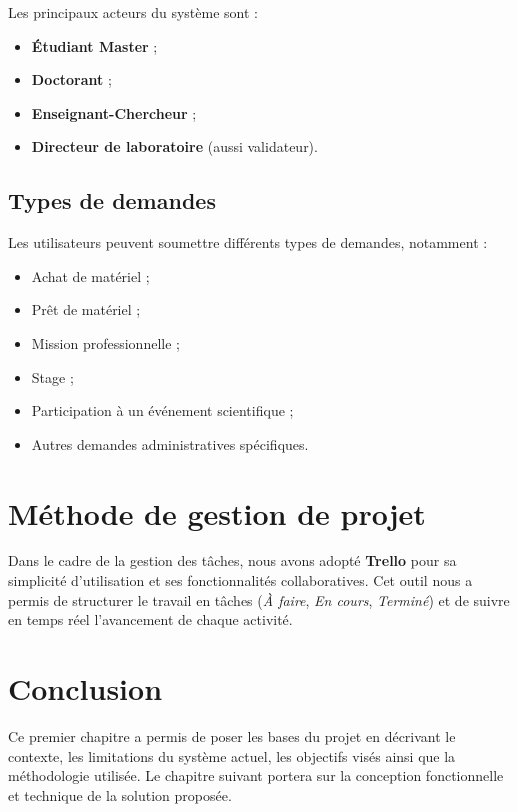 Les principaux acteurs du système sont :
\begin{itemize}
  \item \textbf{Étudiant Master} ;
  \item \textbf{Doctorant} ;
  \item \textbf{Enseignant-Chercheur} ;
  \item \textbf{Directeur de laboratoire} (aussi validateur).
\end{itemize}

\subsection{Types de demandes}

Les utilisateurs peuvent soumettre différents types de demandes, notamment :
\begin{itemize}
  \item Achat de matériel ;
  \item Prêt de matériel ;
  \item Mission professionnelle ;
  \item Stage ;
  \item Participation à un événement scientifique ;
  \item Autres demandes administratives spécifiques.
\end{itemize}

\section{Méthode de gestion de projet}

Dans le cadre de la gestion des tâches, nous avons adopté \textbf{Trello} pour sa simplicité d'utilisation et ses fonctionnalités collaboratives. Cet outil nous a permis de structurer le travail en tâches (\textit{À faire}, \textit{En cours}, \textit{Terminé}) et de suivre en temps réel l'avancement de chaque activité.


\section{Conclusion}

Ce premier chapitre a permis de poser les bases du projet en décrivant le contexte, les limitations du système actuel, les objectifs visés ainsi que la méthodologie utilisée. Le chapitre suivant portera sur la conception fonctionnelle et technique de la solution proposée.

